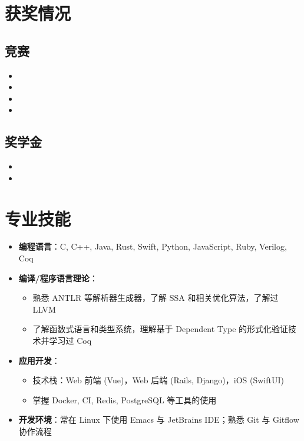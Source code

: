 \documentclass{resume}
\begin{document}
\section{获奖情况}
\subsection{\textbf{竞赛}}
\begin{itemize}
  \item {}
  \item {}
  \item {}
  \item {}
\end{itemize}

\subsection{\textbf{奖学金}}
\begin{itemize}
  \item {}
  \item {}
\end{itemize}

\section{专业技能}
\begin{itemize}
  \item \textbf{编程语言}：C, C++, Java, Rust, Swift, Python, JavaScript, Ruby, Verilog, Coq

  \item \textbf{编译/程序语言理论}：
    \begin{itemize}
      \item 熟悉 ANTLR 等解析器生成器，了解 SSA 和相关优化算法，了解过 LLVM
      \item 了解函数式语言和类型系统，理解基于 Dependent Type 的形式化验证技术并学习过 Coq
    \end{itemize}

  \item \textbf{应用开发}：
    \begin{itemize}
      \item 技术栈：Web 前端 (Vue)，Web 后端 (Rails, Django)，iOS (SwiftUI)
      \item 掌握 Docker, CI, Redis, PostgreSQL 等工具的使用
    \end{itemize}

  \item \textbf{开发环境}：常在 Linux 下使用 Emacs 与 JetBrains IDE；熟悉 Git 与 Gitflow 协作流程
\end{itemize}
 
\end{document}
